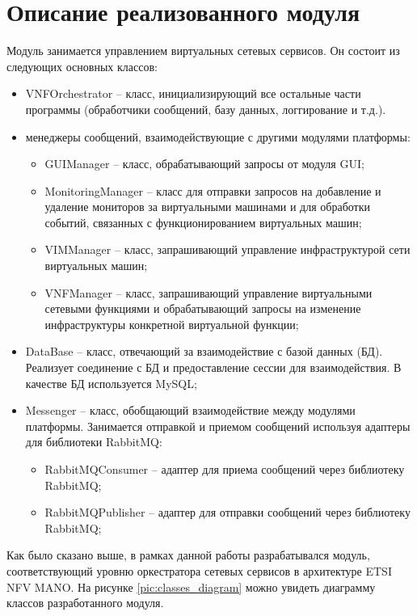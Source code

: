\documentclass[oneside,final,14pt,a4paper]{extreport}
\begin{document}
\section{Описание реализованного модуля}
Модуль занимается управлением виртуальных сетевых сервисов. Он состоит из следующих основных классов:
\begin{itemize}
	\item VNFOrchestrator -- класс, инициализирующий все остальные части программы (обработчики сообщений, базу данных, логгирование и т.д.).
	\item менеджеры сообщений, взаимодействующие с другими модулями платформы:
	\begin{itemize}
		\item GUIManager -- класс, обрабатывающий запросы от модуля GUI;
		\item MonitoringManager -- класс для отправки запросов на добавление и удаление мониторов за виртуальными машинами и для обработки событий, связанных с функционированием виртуальных машин;
		\item VIMManager -- класс, запрашивающий управление инфраструктурой сети виртуальных машин;
		\item VNFManager -- класс, запрашивающий управление виртуальными сетевыми функциями и обрабатывающий запросы на изменение инфраструктуры конкретной виртуальной функции;
	\end{itemize}
	\item DataBase -- класс, отвечающий за взаимодействие с базой данных (БД). Реализует соединение с БД и предоставление сессии для взаимодействия. В качестве БД используется MySQL;
	\item Messenger -- класс, обобщающий взаимодействие между модулями платформы. Занимается отправкой и приемом сообщений используя адаптеры для библиотеки RabbitMQ:
	\begin{itemize}
		\item RabbitMQConsumer -- адаптер для приема сообщений через библиотеку RabbitMQ;
		\item RabbitMQPublisher -- адаптер для отправки сообщений через библиотеку RabbitMQ;
	\end{itemize}
\end{itemize}
Как было сказано выше, в рамках данной работы разрабатывался модуль, соответствующий уровню оркестратора сетевых сервисов в архитектуре ETSI NFV MANO. 
На рисунке \ref{pic:classes_diagram} можно увидеть диаграмму классов разработанного модуля.
\end{document}
